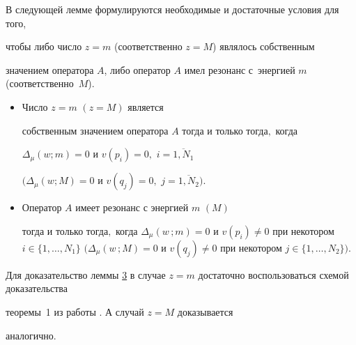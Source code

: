 \smallskip



В следующей лемме формулируются необходимые и достаточные условия для того,

чтобы либо число $z=m$ (соответственно $z=M$) являлось собственным

значением оператора $A$, либо оператор $A$ имел резонанс с~энергией $m$ (соответственно~$M$).



\smallskip



\hypertarget{RD:lemma3}{}



\begin{lemma}[3] 



\begin{itemize}

\item[{\rm 1.}] Число $z=m$ $(z=M)$ является

собственным значением оператора $A$ тогда и только тогда$,$ когда

$\Delta_\mu(w; m)=0$ и $v(p_i)=0,$ $i= \overline{1, N_1}$

$(\Delta_\mu(w; M)=0$ и $v(q_j)=0,$ $j= \overline{1, N_2}).$

\item[{\rm 2.}] Оператор $A$ имеет резонанс с энергией $m$ $(M)$

тогда и только тогда$,$ когда $\Delta_\mu(w\,; m) =0$ и $v(p_i)\neq

0$ при некотором $i\in \{1, \dots, N_1\}$ \newline $(\Delta_\mu(w\,; M) =0$ и $v(q_j)\neq 0$ при некотором $j\in \{1,

\dots, N_2\}).$



\end{itemize}



\end{lemma}



\smallskip



Для доказательство леммы \hyperlink{RD:lemma3}{3} в случае $z=m$ достаточно воспользоваться схемой доказательства

теоремы~1 из работы \cite{RD:bib:RT}. А случай $z=M$ доказывается

аналогично.



